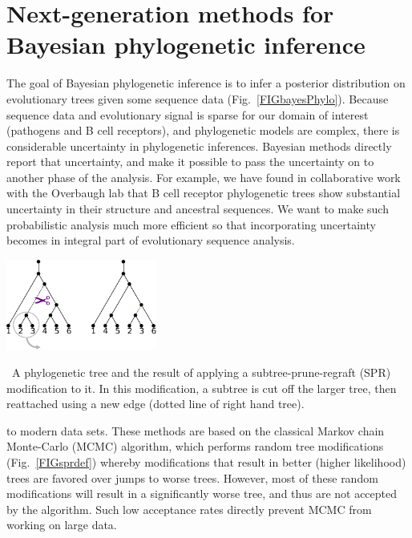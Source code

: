 \documentclass[nobib]{tufte-handout}
\begin{document}
\section{Next-generation methods for Bayesian phylogenetic inference}
\vspace{-0.3cm}
The goal of Bayesian phylogenetic inference is to infer a posterior distribution on evolutionary trees given some sequence data (Fig.~\ref{FIGbayesPhylo}).
Because sequence data and evolutionary signal is sparse for our domain of interest (pathogens and B cell receptors), and phylogenetic models are complex, there is considerable uncertainty in phylogenetic inferences.
Bayesian methods directly report that uncertainty, and make it possible to pass the uncertainty on to another phase of the analysis.
For example, we have found in collaborative work with the Overbaugh lab \cite{Simonich2019-nn} that B cell receptor phylogenetic trees show substantial uncertainty in their structure and ancestral sequences.
We want to make such probabilistic analysis much more efficient so that incorporating uncertainty becomes in integral part of evolutionary sequence analysis.

\begin{marginfigure}[-0.in]%
  \includegraphics[width=1.95in]{spr-definition}
  \caption{\
    A phylogenetic tree and the result of applying a subtree-prune-regraft (SPR) modification to it.
    In this modification, a subtree is cut off the larger tree, then reattached using a new edge (dotted line of right hand tree).
    }
  \label{FIGsprdef}
\end{marginfigure}%

 to modern data sets.
These methods are based on the classical Markov chain Monte-Carlo (MCMC) algorithm, which performs random tree modifications (Fig.~\ref{FIGsprdef}) whereby modifications that result in better (higher likelihood) trees are favored over jumps to worse trees.
However, most of these random modifications will result in a significantly worse tree, and thus are not accepted by the algorithm.
Such low acceptance rates directly prevent MCMC from working on large data.
\end{document}
